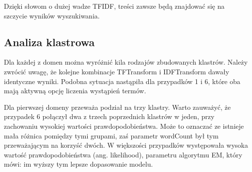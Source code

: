 \documentclass{classrep}
\begin{document}
    Dzięki słowom o dużej wadze TFIDF, treści zawsze będą znajdować się na szczycie wyników wyszukiwania.
    
    \subsection{Analiza klastrowa}
    Dla każdej z domen można wyróżnić kila rodzajów zbudowanych klastrów. Należy zwrócić uwagę, że kolejne kombinacje TFTransform i IDFTransform dawały identyczne wyniki. Podobna sytuacja nastąpiła dla przypadków 1 i 6, które oba mają aktywną opcję liczenia wystąpień termów.

   
    \begin{table}[H]
    \centering
    \caption{Podsumowanie charakterystyki wyników klastrowania dla domeny https://ftims.p.lodz.pl}
    \label{tab:apriori_num_params}
    \end{table}   
    
    \begin{table}[H]
    \centering
    \caption{Podsumowanie charakterystyki wyników klastrowania dla domeny https://www.uni.lodz.pl}
    \label{tab:apriori_num_params}
    \end{table}


    Dla pierwszej domeny przeważa podział na trzy klastry. Warto zauważyć, że przypadek 6 połączył dwa z trzech poprzednich klastrów w jeden, przy zachowaniu wysokiej wartości prawdopodobieństwa. Może to oznaczać ze istnieje mała różnica pomiędzy tymi grupami, zaś parametr wordCount był tym przeważającym na korzyść dwóch. W większości przypadków występowała wysoka wartość prawdopodobieństwa (ang. likelihood), parametru algorytmu EM, który mówi: im wyższy tym lepsze dopasowanie modelu. 
    
\end{document}
